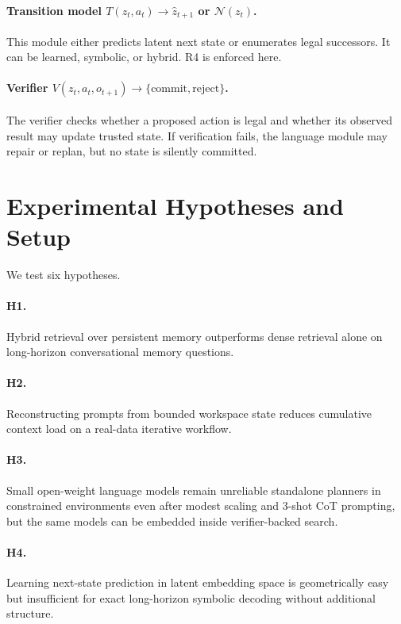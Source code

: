 \documentclass[11pt]{article}
\begin{document}
\paragraph{Transition model $T(z_t, a_t) \rightarrow \hat{z}_{t+1}$ or $\mathcal{N}(z_t)$.} This module either predicts latent next state or enumerates legal successors. It can be learned, symbolic, or hybrid. R4 is enforced here.

\paragraph{Verifier $V(z_t, a_t, o_{t+1}) \rightarrow \{\mathrm{commit}, \mathrm{reject}\}$.} The verifier checks whether a proposed action is legal and whether its observed result may update trusted state. If verification fails, the language module may repair or replan, but no state is silently committed.

\section{Experimental Hypotheses and Setup}
We test six hypotheses.

\paragraph{H1.} Hybrid retrieval over persistent memory outperforms dense retrieval alone on long-horizon conversational memory questions.

\paragraph{H2.} Reconstructing prompts from bounded workspace state reduces cumulative context load on a real-data iterative workflow.

\paragraph{H3.} Small open-weight language models remain unreliable standalone planners in constrained environments even after modest scaling and 3-shot CoT prompting, but the same models can be embedded inside verifier-backed search.

\paragraph{H4.} Learning next-state prediction in latent embedding space is geometrically easy but insufficient for exact long-horizon symbolic decoding without additional structure.
\end{document}
